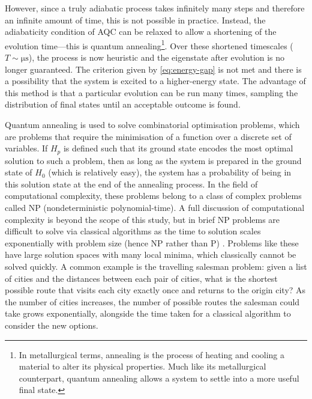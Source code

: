 \documentclass[12pt]{article}
\theoremstyle{definition}
\begin{document}
However, since a truly adiabatic process takes infinitely many steps and therefore an infinite amount of time, this is not possible in practice. Instead, the adiabaticity condition of AQC can be relaxed to allow a shortening of the evolution time---this is quantum annealing\footnote{In metallurgical terms, annealing is the process of heating and cooling a material to alter its physical properties. Much like its metallurgical counterpart, quantum annealing allows a system to settle into a more useful final state.}. Over these shortened timescales ($T\sim\unit{\us}$), the process is now heuristic and the eigenstate after evolution is no longer guaranteed. The criterion given by \cref{eq:energy-gap} is not met and there is a possibility that the system is excited to a higher-energy state. The advantage of this method is that a particular evolution can be run many times, sampling the distribution of final states until an acceptable outcome is found.

Quantum annealing is used to solve combinatorial optimisation problems, which are problems that require the minimisation of a function over a discrete set of variables. If $H_p$ is defined such that its ground state encodes the most optimal solution to such a problem, then as long as the system is prepared in the ground state of $H_0$ (which is relatively easy), the system has a probability of being in this solution state at the end of the annealing process. In the field of computational complexity, these problems belong to a class of complex problems called NP (nondeterministic polynomial-time). A full discussion of computational complexity is beyond the scope of this study, but in brief NP problems are difficult to solve via classical algorithms as the time to solution scales exponentially with problem size (hence NP rather than P) \cite{au-yeung_np-hard_2023}. Problems like these have large solution spaces with many local minima, which classically cannot be solved quickly. A common example is the travelling salesman problem: given a list of cities and the distances between each pair of cities, what is the shortest possible route that visits each city exactly once and returns to the origin city? As the number of cities increases, the number of possible routes the salesman could take grows exponentially, alongside the time taken for a classical algorithm to consider the new options.
\end{document}
